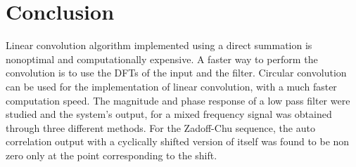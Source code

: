 \documentclass[11pt, a4paper]{article}
\begin{document}
\section{Conclusion}
Linear convolution algorithm implemented using a direct summation is nonoptimal and computationally expensive. A faster way to perform the convolution is to use the DFTs of the input and the filter. Circular convolution can be used for the implementation of linear convolution, with a much faster computation speed. The magnitude and phase response of a low pass filter were studied and the system’s output, for a mixed frequency signal was obtained through three different methods. For the Zadoff-Chu sequence, the auto correlation output with a cyclically shifted version of itself was found
to be non zero only at the point corresponding to the shift.
\end{document}

